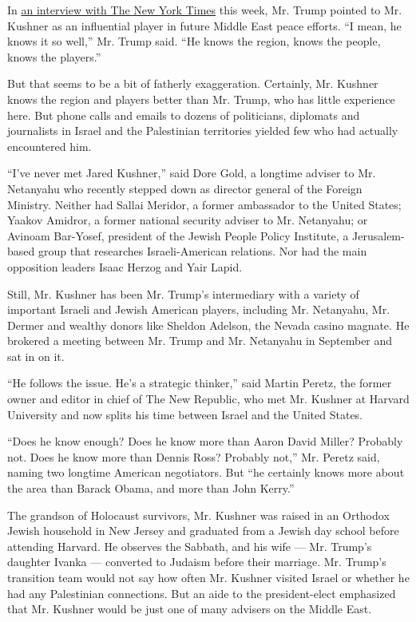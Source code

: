 In
\href{http://www.nytimes.com/2016/11/23/us/politics/trump-new-york-times-interview-transcript.html}{an
interview with The New York Times} this week, Mr. Trump pointed to Mr.
Kushner as an influential player in future Middle East peace efforts.
``I mean, he knows it so well,'' Mr. Trump said. ``He knows the region,
knows the people, knows the players.''

But that seems to be a bit of fatherly exaggeration. Certainly, Mr.
Kushner knows the region and players better than Mr. Trump, who has
little experience here. But phone calls and emails to dozens of
politicians, diplomats and journalists in Israel and the Palestinian
territories yielded few who had actually encountered him.

``I've never met Jared Kushner,'' said Dore Gold, a longtime adviser to
Mr. Netanyahu who recently stepped down as director general of the
Foreign Ministry. Neither had Sallai Meridor, a former ambassador to the
United States; Yaakov Amidror, a former national security adviser to Mr.
Netanyahu; or Avinoam Bar-Yosef, president of the Jewish People Policy
Institute, a Jerusalem-based group that researches Israeli-American
relations. Nor had the main opposition leaders Isaac Herzog and Yair
Lapid.

Still, Mr. Kushner has been Mr. Trump's intermediary with a variety of
important Israeli and Jewish American players, including Mr. Netanyahu,
Mr. Dermer and wealthy donors like Sheldon Adelson, the Nevada casino
magnate. He brokered a meeting between Mr. Trump and Mr. Netanyahu in
September and sat in on it.

``He follows the issue. He's a strategic thinker,'' said Martin Peretz,
the former owner and editor in chief of The New Republic, who met Mr.
Kushner at Harvard University and now splits his time between Israel and
the United States.

``Does he know enough? Does he know more than Aaron David Miller?
Probably not. Does he know more than Dennis Ross? Probably not,'' Mr.
Peretz said, naming two longtime American negotiators. But ``he
certainly knows more about the area than Barack Obama, and more than
John Kerry.''

The grandson of Holocaust survivors, Mr. Kushner was raised in an
Orthodox Jewish household in New Jersey and graduated from a Jewish day
school before attending Harvard. He observes the Sabbath, and his wife
--- Mr. Trump's daughter Ivanka --- converted to Judaism before their
marriage. Mr. Trump's transition team would not say how often Mr.
Kushner visited Israel or whether he had any Palestinian connections.
But an aide to the president-elect emphasized that Mr. Kushner would be
just one of many advisers on the Middle East.

